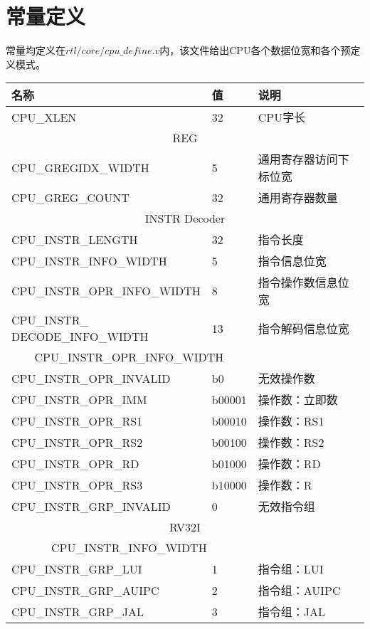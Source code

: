 \section{常量定义}
常量均定义在$rtl/core/cpu\_define.v$内，该文件给出CPU各个数据位宽和各个预定义模式。\\
\begin{center}
\begin{tabular}{|l|p{3cm}|p{6cm}|}
    \hline
    名称    &   值  &   说明\\\hline
    CPU\_XLEN   &   32  &   CPU字长\\\hline
    \multicolumn{3}{|c|}{REG}\\\hline
    CPU\_GREGIDX\_WIDTH &   5   &   通用寄存器访问下标位宽\\\hline
    CPU\_GREG\_COUNT    &   32  &   通用寄存器数量\\\hline
    \multicolumn{3}{|c|}{INSTR Decoder}\\\hline
    CPU\_INSTR\_LENGTH & 32 & 指令长度\\\hline
    CPU\_INSTR\_INFO\_WIDTH & 5 & 指令信息位宽\\\hline
    CPU\_INSTR\_OPR\_INFO\_WIDTH & 8 & 指令操作数信息位宽\\\hline
    \makecell[{}{p{3cm}}]{CPU\_INSTR\_ \\ DECODE\_INFO\_WIDTH} & 13 & 指令解码信息位宽\\\hline
    \multicolumn{2}{|c|}{CPU\_INSTR\_OPR\_INFO\_WIDTH}&\\\hline
    CPU\_INSTR\_OPR\_INVALID & b0 & 无效操作数\\\hline
    CPU\_INSTR\_OPR\_IMM & b00001 & 操作数：立即数\\\hline
    CPU\_INSTR\_OPR\_RS1 & b00010 & 操作数：RS1\\\hline
    CPU\_INSTR\_OPR\_RS2 & b00100 & 操作数：RS2\\\hline
    CPU\_INSTR\_OPR\_RD & b01000 & 操作数：RD\\\hline
    CPU\_INSTR\_OPR\_RS3 & b10000 & 操作数：R\\\hline
    CPU\_INSTR\_GRP\_INVALID & 0 & 无效指令组\\\hline
    \multicolumn{3}{|c|}{RV32I}\\\hline
    \multicolumn{2}{|c|}{CPU\_INSTR\_INFO\_WIDTH}&\\\hline
    CPU\_INSTR\_GRP\_LUI & 1 & 指令组：LUI\\\hline
    CPU\_INSTR\_GRP\_AUIPC & 2 & 指令组：AUIPC\\\hline
    CPU\_INSTR\_GRP\_JAL & 3 & 指令组：JAL\\\hline

\end{tabular}
\end{center}
